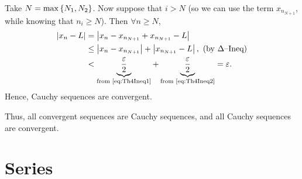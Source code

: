\documentclass[12pt]{article}
\theoremstyle{definition}
\renewenvironment{proof}[1][\proofname]{\vspace{-10pt}\begin{replacementproof}}{\end{replacementproof}}
\begin{document}
\begin{proof}
        Take $N = \max\left\{N_{1}, N_{2}\right\}$. Now suppose that $i > N$ (so we can use the term $x_{n_{N + 1}}$, while knowing that $n_{i} \geq N$). 
        Then $\forall n \geq N$,
        \begin{align*}
            \left|x_{n} - L\right| &= \left|x_{n} - x_{n_{N + 1}} + x_{n_{N + 1}} - L\right| \\
                            &\leq \left|x_{n} - x_{n_{N + 1}}\right| + \left|x_{n_{N + 1}} - L\right|, ~ \text{(by $\Delta$--Ineq)} \\
                            &< \underbrace{\frac{\varepsilon}{2}}_{\text{from \eqref{eq:Th4Ineq1}}} + \underbrace{\frac{\varepsilon}{2}}_{\text{from \eqref{eq:Th4Ineq2}}} = \varepsilon.
        \end{align*} 
        Hence, Cauchy sequences are convergent. 

        Thus, all convergent sequences are Cauchy sequences, and all Cauchy sequences are convergent.
    \end{proof}
    \section{Series}
\end{document}
